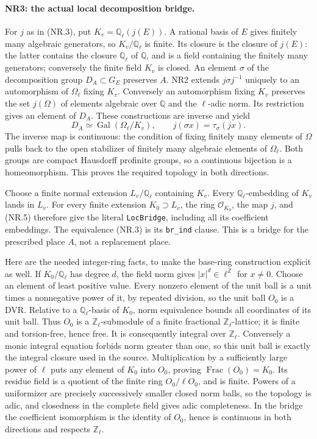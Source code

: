 \paragraph{NR3: the actual local decomposition bridge.}
For $j$ as in (NR.3), put $K_v=\mathbb Q_\ell(j(E))$.
A rational basis of $E$ gives finitely many algebraic generators,
so $K_v/\mathbb Q_\ell$ is finite. Its closure is the closure of
$j(E)$: the latter contains the closure $\mathbb Q_\ell$ of
$\mathbb Q$, and is a field containing the finitely many generators;
conversely the finite field $K_v$ is closed.
An element $\sigma$ of the decomposition group $D_A\subset G_E$
preserves $A$. NR2 extends $j\sigma j^{-1}$ uniquely to an
automorphism of $\Omega_\ell$ fixing $K_v$. Conversely an automorphism
fixing $K_v$ preserves the set $j(\Omega)$ of elements algebraic over
$\mathbb Q$ and the $\ell$-adic norm. Its restriction gives an element
of $D_A$. These constructions are inverse and yield
\[
       D_A\simeq\operatorname{Gal}(\Omega_\ell/K_v),
       \qquad j(\sigma x)=\tau_\sigma(jx).              \tag{NR.5}
\]
The inverse map is continuous: the condition of fixing finitely many
elements of $\Omega$ pulls back to the open stabilizer of finitely
many algebraic elements of $\Omega_\ell$. Both groups are compact
Hausdorff profinite groups, so a continuous bijection is a
homeomorphism. This proves the required topology in both directions.

Choose a finite normal extension $L_v/\mathbb Q_\ell$ containing
$K_v$. Every $\mathbb Q_\ell$-embedding of $K_v$ lands in $L_v$.
For every finite extension $K_0\supset L_v$, the ring
$\mathcal O_{K_0}$, the map $j$, and (NR.5) therefore give the
literal \texttt{LocBridge}, including all its coefficient embeddings.
The equivalence (NR.3) is its \texttt{br\_ind} clause. This is a
bridge for the prescribed place $A$, not a replacement place.

Here are the needed integer-ring facts, to make the base-ring
construction explicit as well. If $K_0/\mathbb Q_\ell$ has degree
$d$, the field norm gives $|x|^d\in\ell^{\mathbb Z}$ for $x\ne0$.
Choose an element of least positive value. Every nonzero element
of the unit ball is a unit times a nonnegative power of it, by
repeated division, so the unit ball $O_0$ is a DVR. Relative to
a $\mathbb Q_\ell$-basis of $K_0$, norm equivalence bounds all
coordinates of its unit ball. Thus $O_0$ is a $\mathbb Z_\ell$-submodule
of a finite fractional $\mathbb Z_\ell$-lattice; it is finite and
torsion-free, hence free. It is consequently integral over
$\mathbb Z_\ell$. Conversely a monic integral equation forbids
norm greater than one, so this unit ball is exactly the integral
closure used in the source. Multiplication by a sufficiently
large power of $\ell$ puts any element of $K_0$ into $O_0$, proving
$\operatorname{Frac}(O_0)=K_0$. Its residue field is a quotient of
the finite ring $O_0/\ell O_0$, and is finite. Powers of a
uniformizer are precisely successively smaller closed norm
balls, so the topology is adic, and closedness in the complete
field gives adic completeness. In the bridge the coefficient
isomorphism is the identity of $O_0$, hence is continuous in
both directions and respects $\mathbb Z_\ell$.

